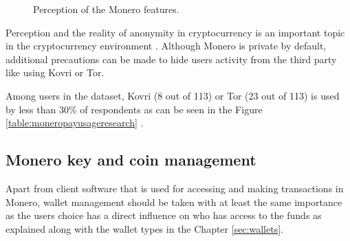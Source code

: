 \documentclass[
  printed, %
  table,   %
  lof,     %
  lot,     %
           oneside, color
]{fithesis3}
\begin{document}
\begin{center}
\begin{figure}[H]
\caption{Perception of the Monero features.}
\label{chart:price}\end{figure}\end{center}

Perception and the reality of anonymity in cryptocurrency is an important topic in the cryptocurrency environment \cite{amarasinghe2019survey}. Although Monero is private by default, additional precautions can be made to hide users activity from the third party like using Kovri or Tor. 

Among users in the dataset, Kovri (8 out of 113) or Tor (23 out of 113) is used by less than 30\% of respondents as can be seen in the Figure \ref{table:moneropayusageresearch} .

\subsection{Monero key and coin management}
Apart from client software that is used for accessing and making transactions in Monero, wallet management should be taken with at least the same importance as the users choice has a direct influence on who has access to the funds as explained along with the wallet types in the Chapter \ref{sec:wallets}.
\end{document}
